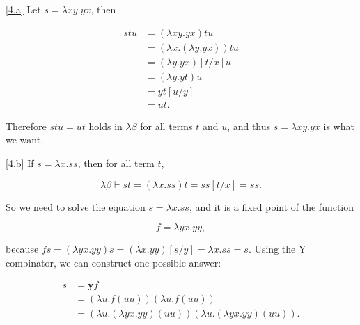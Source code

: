 \documentclass{homework}
\begin{document}
\begin{problem}
\end{problem}

\begin{solution}

  \ref{4.a}
  Let $s = \lambda xy.yx$, then

  \begin{align*}
    stu & = (\lambda xy.yx)tu \\
    & = (\lambda x.(\lambda y.yx))tu \\
    & = (\lambda y.yx)[t/x]u \\
    & = (\lambda y.yt)u \\
    & = yt[u/y] \\
    & = ut.
  \end{align*}

  Therefore $stu = ut$ holds in $\lambda\beta$ for all terms $t$ and $u$,
  and thus $s = \lambda xy.yx$ is what we want.

  \ref{4.b}
  If $s = \lambda x.ss$, then for all term $t$,

  \begin{equation*}
    \lambda\beta \vdash st = (\lambda x.ss)t = ss[t/x] = ss.
  \end{equation*}

  So we need to solve the equation $s = \lambda x.ss$,
  and it is a fixed point of the function

  \begin{equation*}
    f = \lambda yx.yy,
  \end{equation*}

  because $fs = (\lambda yx.yy)s = (\lambda x.yy)[s/y] = \lambda x.ss = s$.
  Using the Y combinator, we can construct one possible answer:

  \begin{align*}
    s & = \mathbf{y}f \\
    & = (\lambda u. f(uu))(\lambda u. f(uu)) \\
    & = (\lambda u. (\lambda yx.yy)(uu))(\lambda u. (\lambda yx.yy)(uu)).
  \end{align*}

\end{solution}
\end{document}
